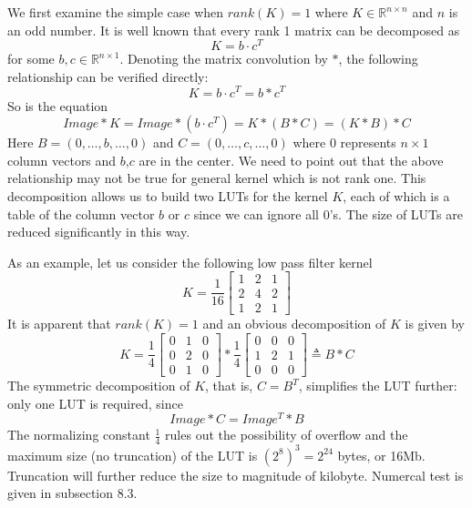 \documentclass[12pt]{amsart}
\theoremstyle{definition}
\theoremstyle{remark}
\numberwithin{thm}{section}
\begin{document}
We first examine the simple case when $rank(K)=1$ where $K\in \mathbb{R}^{n\times n}$ and $n$ is an odd number. It is well known that every rank 1 matrix can be decomposed as
\[K=b\cdot c^T\]
for some $b,c\in \mathbb{R}^{n\times 1}$. Denoting the matrix convolution by $*$, the following relationship can be verified directly: 
\[K=b\cdot c^T=b*c^T\]
So is the equation
\[Image*K=Image*(b\cdot c^T)=K*(B*C)=(K*B)*C\]
Here $B=(0,\dots,b,\dots,0)$ and $C=(0,\dots,c,\dots,0)$ where $0$ represents $n\times 1$ column vectors and $b$,$c$ are in the center. We need to point out that the above relationship may not be true for general kernel which is not rank one. This decomposition allows us to build two LUTs for the kernel $K$, each of which is a table of the column vector $b$ or $c$ since we can ignore all $0$'s. The size of LUTs are reduced significantly in this way.

As an example, let us consider the following low pass filter kernel
$$
K=\frac{1}{16}
\begin{bmatrix}
1 & 2 & 1\\
2 & 4 & 2\\
1 & 2 & 1
\end{bmatrix}
$$
It is apparent that $rank(K)=1$ and an obvious decomposition of $K$ is given by 
$$
K=\frac{1}{4}
\begin{bmatrix}
0 & 1 & 0\\
0 & 2 & 0\\
0 & 1 & 0
\end{bmatrix}*\frac{1}{4}
\begin{bmatrix}
0 & 0 & 0\\
1 & 2 & 1\\
0 & 0 & 0
\end{bmatrix}\triangleq B*C
$$
The symmetric decomposition of $K$, that is, $C=B^T$, simplifies the LUT further: only one LUT is required, since
\[Image*C=Image^T*B\]
The normalizing constant $\frac{1}{4}$ rules out the possibility of overflow and the maximum size (no truncation) of the LUT is $(2^8)^3=2^{24}$ bytes, or 16Mb. Truncation will further reduce the size to magnitude of kilobyte. Numercal test is given in subsection 8.3. 
\end{document}
